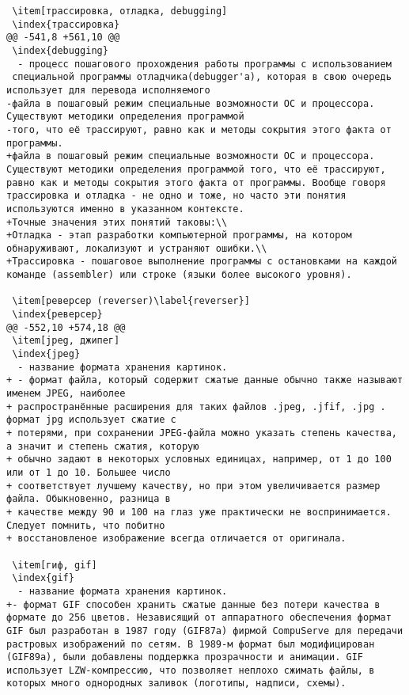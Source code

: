 \begin{verbatim}
 \item[трассировка, отладка, debugging]
 \index{трассировка}
@@ -541,8 +561,10 @@
 \index{debugging}
  - процесс пошагового прохождения работы программы с использованием
 специальной программы отладчика(debugger'а), которая в свою очередь использует для перевода исполняемого
-файла в пошаговый режим специальные возможности ОС и процессора. Существуют методики определения программой
-того, что её трассируют, равно как и методы сокрытия этого факта от программы.
+файла в пошаговый режим специальные возможности ОС и процессора. Существуют методики определения программой того, что её трассируют, равно как и методы сокрытия этого факта от программы. Вообще говоря трассировка и отладка - не одно и тоже, но часто эти понятия используются именно в указанном контексте.
+Точные значения этих понятий таковы:\\
+Отладка - этап разработки компьютерной программы, на котором обнаруживают, локализуют и устраняют ошибки.\\
+Трассировка - пошаговое выполнение программы с остановками на каждой команде (assembler) или строке (языки более высокого уровня).

 \item[реверсер (reverser)\label{reverser}]
 \index{реверсер}
@@ -552,10 +574,18 @@
 \item[jpeg, джипег]
 \index{jpeg}
  - название формата хранения картинок.
+ - формат файла, который содержит сжатые данные обычно также называют именем JPEG, наиболее
+ распространённые расширения для таких файлов .jpeg, .jfif, .jpg . формат jpg использует сжатие с
+ потерями, при сохранении JPEG-файла можно указать степень качества, а значит и степень сжатия, которую
+ обычно задают в некоторых условных единицах, например, от 1 до 100 или от 1 до 10. Большее число
+ соответствует лучшему качеству, но при этом увеличивается размер файла. Обыкновенно, разница в
+ качестве между 90 и 100 на глаз уже практически не воспринимается. Следует помнить, что побитно
+ восстановленое изображение всегда отличается от оригинала.

 \item[гиф, gif]
 \index{gif}
  - название формата хранения картинок.
+- формат GIF способен хранить сжатые данные без потери качества в формате до 256 цветов. Независящий от аппаратного обеспечения формат GIF был разработан в 1987 году (GIF87a) фирмой CompuServe для передачи растровых изображений по сетям. В 1989-м формат был модифицирован (GIF89a), были добавлены поддержка прозрачности и анимации. GIF использует LZW-компрессию, что позволяет неплохо сжимать файлы, в которых много однородных заливок (логотипы, надписи, схемы).


\end{verbatim}
